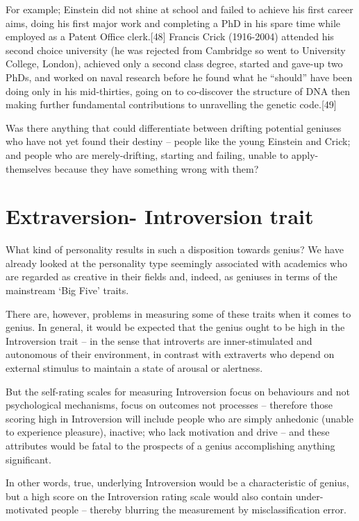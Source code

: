 \documentclass[
]{book}
\begin{document}
For example; Einstein did not shine at school and failed to achieve his first career aims, doing his first major work and completing a PhD in his spare time while employed as a Patent Office clerk.{[}48{]} Francis Crick (1916-2004) attended his second choice university (he was rejected from Cambridge so went to University College, London), achieved only a second class degree, started and gave-up two PhDs, and worked on naval research before he found what he ``should'' have been doing only in his mid-thirties, going on to co-discover the structure of DNA then making further fundamental contributions to unravelling the genetic code.{[}49{]}

Was there anything that could differentiate between drifting potential geniuses who have not yet found their destiny -- people like the young Einstein and Crick; and people who are merely-drifting, starting and failing, unable to apply-themselves because they have something wrong with them?

\hypertarget{extraversion--introversion-trait}{%
\section{Extraversion- Introversion trait}\label{extraversion--introversion-trait}}

What kind of personality results in such a disposition towards genius? We have already looked at the personality type seemingly associated with academics who are regarded as creative in their fields and, indeed, as geniuses in terms of the mainstream `Big Five' traits.

There are, however, problems in measuring some of these traits when it comes to genius. In general, it would be expected that the genius ought to be high in the Introversion trait -- in the sense that introverts are inner-stimulated and autonomous of their environment, in contrast with extraverts who depend on external stimulus to maintain a state of arousal or alertness.

But the self-rating scales for measuring Introversion focus on behaviours and not psychological mechanisms, focus on outcomes not processes -- therefore those scoring high in Introversion will include people who are simply anhedonic (unable to experience pleasure), inactive; who lack motivation and drive -- and these attributes would be fatal to the prospects of a genius accomplishing anything significant.

In other words, true, underlying Introversion would be a characteristic of genius, but a high score on the Introversion rating scale would also contain under-motivated people -- thereby blurring the measurement by misclassification error.
\end{document}
